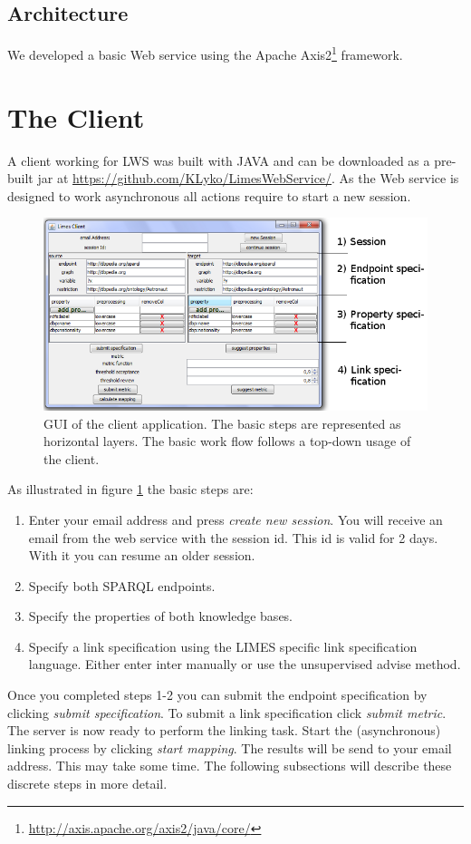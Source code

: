 \documentclass{article}
\begin{document}
\subsection{Architecture}
We developed a basic Web service using the Apache Axis2\footnote{\url{http://axis.apache.org/axis2/java/core/}} framework. 

\newpage
\section{The Client}
A client working for LWS was built with JAVA and can be downloaded as a pre-built jar at \url{https://github.com/KLyko/LimesWebService/}. As the Web service is designed to work asynchronous all actions require to start a new session.\\
\begin{figure}[h]
	\centering
		\includegraphics[width=7in]{images/Client_tasks.png}
	\caption{GUI of the client application. The basic steps are represented as horizontal layers. The basic work flow follows a top-down usage of the client.}
	\label{fig:client_tasks}
\end{figure}
As illustrated in figure \ref{fig:client_tasks} the basic steps are:
\begin{enumerate}
	\item Enter your email address and press \textit{create new session}. You will receive an email from the web service with the session id. This id is valid for 2 days. With it you can resume an older session.
	\item Specify both SPARQL endpoints.
	\item Specify the properties of both knowledge bases. 
	\item Specify a link specification using the LIMES specific link specification language. Either enter inter manually or use the unsupervised advise method.
\end{enumerate}
Once you completed steps 1-2 you can submit the endpoint specification by clicking \textit{submit specification}. To submit a link specification click \textit{submit metric}. The server is now ready to perform the linking task. Start the (asynchronous) linking process by clicking \textit{start mapping}. The results will be send to your email address. This may take some time.
The following subsections will describe these discrete steps in more detail.
\end{document}
